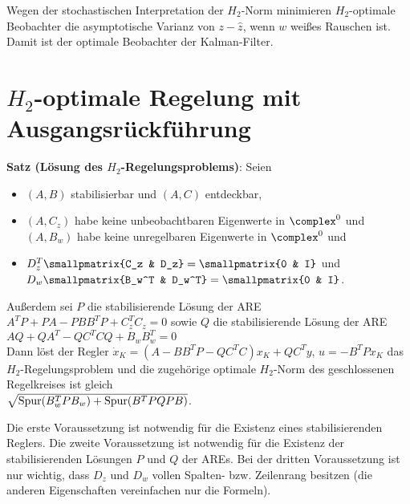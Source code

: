 Wegen der stochastischen Interpretation der $H_2$-Norm minimieren
$H_2$-optimale Beobachter die asymptotische Varianz von $z - \widehat{z}$,
wenn $w$ weißes Rauschen ist.
Damit ist der optimale Beobachter der Kalman-Filter.

\section{%
    \texorpdfstring{$H_2$-optimale}{H₂-optimale} Regelung mit Ausgangsrückführung%
}

\textbf{Satz (Lösung des $H_2$-Regelungsproblems)}:
Seien
\begin{itemize}
    \item
    $(A, B)$ stabilisierbar und $(A, C)$ entdeckbar,

    \item
    $(A, C_z)$ habe keine unbeobachtbaren Eigenwerte in $\complex^0$ und\\
    $(A, B_w)$ habe keine unregelbaren Eigenwerte in $\complex^0$ und

    \item
    $D_z^T \smallpmatrix{C_z & D_z} = \smallpmatrix{0 & I}$ und
    $D_w \smallpmatrix{B_w^T & D_w^T} = \smallpmatrix{0 & I}$.
\end{itemize}
Außerdem sei $P$ die stabilisierende Lösung der ARE $A^T P + PA - PBB^T P + C_z^T C_z = 0$
sowie $Q$ die stabilisierende Lösung der ARE $AQ + QA^T - QC^T CQ + B_w B_w^T = 0$\\
Dann löst der Regler
$\dot{x}_K = (A - BB^T P - QC^T C) x_K + QC^T y$, $u = -B^T P x_K$
das $H_2$-Regelungsproblem und die zugehörige optimale $H_2$-Norm des geschlossenen Regelkreises
ist gleich\\
$\sqrt{\operatorname{Spur}(B_w^T P B_w) + \operatorname{Spur}(B^T PQPB)}$.

Die erste Voraussetzung ist notwendig für die Existenz eines stabilisierenden Reglers.
Die zweite Voraussetzung ist notwendig für die Existenz der stabilisierenden Lösungen $P$ und $Q$
der AREs.
Bei der dritten Voraussetzung ist nur wichtig, dass $D_z$ und $D_w$ vollen Spalten- bzw.
Zeilenrang besitzen (die anderen Eigenschaften vereinfachen nur die Formeln).

\pagebreak
